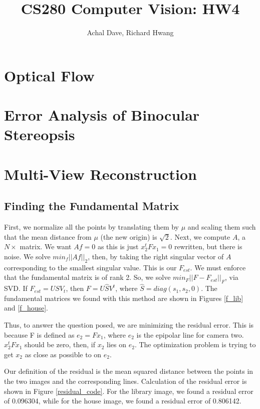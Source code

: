 \documentclass[11pt]{article}
\begin{document}
\title{CS280 Computer Vision: HW4}
\author{Achal Dave, Richard Hwang}
\maketitle

\section{Optical Flow}

\newpage
\section{Error Analysis of Binocular Stereopsis}

\newpage
\section{Multi-View Reconstruction}
\subsection{Finding the Fundamental Matrix}
First, we normalize all the points by translating them by $\mu$ and scaling
them such that the mean distance from $\mu$ (the new origin) is $\sqrt{2}$.
Next, we compute $A$, a $N\times$ matrix. We want $Af = 0$ as this is just
$x_2^tFx_1 = 0$ rewritten, but there is noise. We solve $min_f||Af||_2$, then,
by taking the right singular vector of $A$ corresponding to the smallest
singular value. This is our $F_{est}$. We must enforce that the fundamental
matrix is of rank 2. So, we solve $min_F||F-F_{est}||_F$, via SVD. If
$F_{est} = USV_t$, then $F = U\hat{S}V^t$, where $\hat{S} = diag(s_1, s_2, 0)$.
The fundamental matrices we found with this method are shown in Figures
\ref{f_lib} and \ref{f_house}.

Thus, to answer the question posed, we are minimizing the residual error.
This is because F is defined as $e_2 = Fx_1$, where $e_2$ is the epipolar line
for camera two.  $x_2^tFx_1$ should be zero, then, if $x_2$ lies on $e_2$. The
optimization problem is trying to get $x_2$ as close as possible to on $e_2$.

Our definition of the residual is the mean squared distance between the points
in the two images and the corresponding lines. Calculation of the residual
error is shown in Figure \ref{residual_code}. For the library image,
we found a residual error of 0.096304, while for the house image, we found
a residual error of 0.806142.
\end{document}
